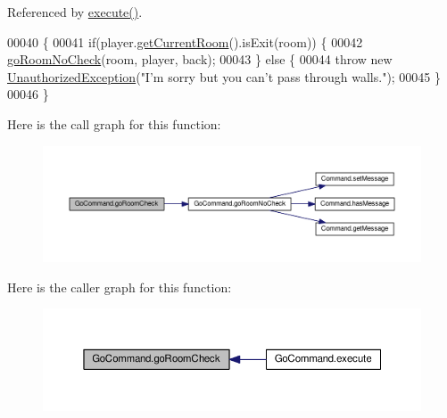 Referenced by \hyperlink{GoCommand_8java_source_l00022}{execute()}.


\begin{DoxyCode}
00040                                                                                                            
                        \{
00041         \textcolor{keywordflow}{if}(player.\hyperlink{classPlayer_a3a3107df50fc4e35e8c0f46c3f776ce6}{getCurrentRoom}().isExit(room)) \{
00042             \hyperlink{classGoCommand_a3149bf695c19b78c39cfc4dadece7846}{goRoomNoCheck}(room, player, back);
00043         \} \textcolor{keywordflow}{else} \{
00044             \textcolor{keywordflow}{throw} \textcolor{keyword}{new} \hyperlink{classUnauthorizedException}{UnauthorizedException}(\textcolor{stringliteral}{"I'm sorry but you can't pass through
       walls."});
00045         \}
00046     \}
\end{DoxyCode}


Here is the call graph for this function\-:
\nopagebreak
\begin{figure}[H]
\begin{center}
\leavevmode
\includegraphics[width=350pt]{classGoCommand_a1fce2ad8ed1faf41fa300064585b3616_cgraph}
\end{center}
\end{figure}




Here is the caller graph for this function\-:
\nopagebreak
\begin{figure}[H]
\begin{center}
\leavevmode
\includegraphics[width=350pt]{classGoCommand_a1fce2ad8ed1faf41fa300064585b3616_icgraph}
\end{center}
\end{figure}


